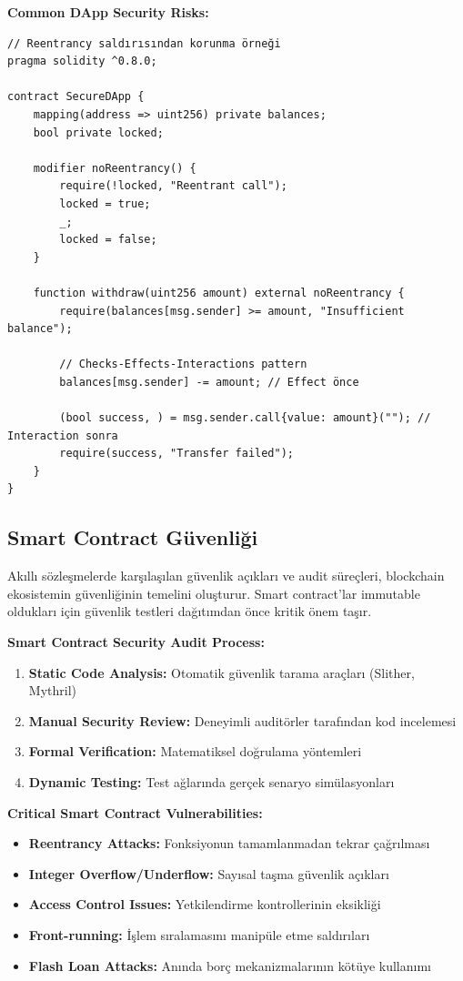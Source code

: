 \textbf{Common DApp Security Risks:}
\begin{lstlisting}[breaklines=true,basicstyle=\ttfamily\footnotesize]
// Reentrancy saldırısından korunma örneği
pragma solidity ^0.8.0;

contract SecureDApp {
    mapping(address => uint256) private balances;
    bool private locked;
    
    modifier noReentrancy() {
        require(!locked, "Reentrant call");
        locked = true;
        _;
        locked = false;
    }
    
    function withdraw(uint256 amount) external noReentrancy {
        require(balances[msg.sender] >= amount, "Insufficient balance");
        
        // Checks-Effects-Interactions pattern
        balances[msg.sender] -= amount; // Effect önce
        
        (bool success, ) = msg.sender.call{value: amount}(""); // Interaction sonra
        require(success, "Transfer failed");
    }
}
\end{lstlisting}

\subsection{Smart Contract Güvenliği}

Akıllı sözleşmelerde karşılaşılan güvenlik açıkları ve audit süreçleri, blockchain ekosistemin güvenliğinin temelini oluşturur. Smart contract'lar immutable oldukları için güvenlik testleri dağıtımdan önce kritik önem taşır.

\textbf{Smart Contract Security Audit Process:}
\begin{enumerate}
    \item \textbf{Static Code Analysis:} Otomatik güvenlik tarama araçları (Slither, Mythril)
    \item \textbf{Manual Security Review:} Deneyimli auditörler tarafından kod incelemesi
    \item \textbf{Formal Verification:} Matematiksel doğrulama yöntemleri
    \item \textbf{Dynamic Testing:} Test ağlarında gerçek senaryo simülasyonları
\end{enumerate}

\textbf{Critical Smart Contract Vulnerabilities:}
\begin{itemize}
    \item \textbf{Reentrancy Attacks:} Fonksiyonun tamamlanmadan tekrar çağrılması
    \item \textbf{Integer Overflow/Underflow:} Sayısal taşma güvenlik açıkları
    \item \textbf{Access Control Issues:} Yetkilendirme kontrollerinin eksikliği
    \item \textbf{Front-running:} İşlem sıralamasını manipüle etme saldırıları
    \item \textbf{Flash Loan Attacks:} Anında borç mekanizmalarının kötüye kullanımı
\end{itemize}

